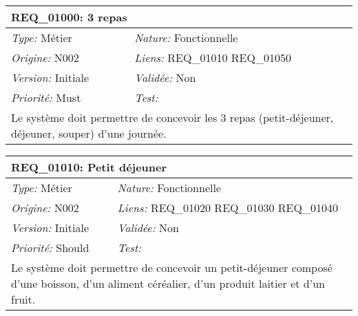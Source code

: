 
\begin{table}[!ht]

\begin{tabular}{|p{60mm}p{100mm}|}

\hline

\multicolumn{2}{|l|}{\textbf{REQ\_01000:} 3 repas} \\ \hline

\emph{Type:} Métier & \emph{Nature:} Fonctionnelle \\

\emph{Origine:} N002 & \emph{Liens:} REQ\_01010 REQ\_01050  \\

\emph{Version:} Initiale & \emph{Validée:} Non \\

\emph{Priorité:} Must & \emph{Test:} \\ \hline

\multicolumn{2}{|p{16cm}|}{Le système doit permettre de concevoir les 3 repas (petit-déjeuner, déjeuner, souper) d'une journée.} \\ \hline

\end{tabular}

\end{table}



\begin{table}[!ht]

\begin{tabular}{|p{60mm}p{100mm}|}

\hline

\multicolumn{2}{|l|}{\textbf{REQ\_01010:} Petit déjeuner} \\ \hline

\emph{Type:} Métier & \emph{Nature:} Fonctionnelle \\

\emph{Origine:} N002 & \emph{Liens:} REQ\_01020 REQ\_01030 REQ\_01040  \\

\emph{Version:} Initiale & \emph{Validée:} Non \\

\emph{Priorité:} Should & \emph{Test:} \\ \hline

\multicolumn{2}{|p{16cm}|}{Le système doit permettre de concevoir un petit-déjeuner composé d'une boisson, d'un aliment céréalier, d'un produit laitier et d'un fruit.} \\ \hline

\end{tabular}

\end{table}



